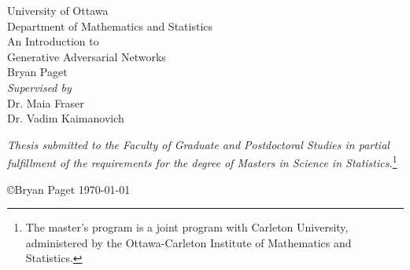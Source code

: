 \begin{titlepage}
  \scshape
  \begin{center}
    \LARGE
    University of Ottawa \\
    \small
    Department of Mathematics and Statistics \\
    \vspace{1cm}
    \Large
    An Introduction to \\
    \vspace{-0.2cm}
    \huge
    Generative Adversarial Networks \\
    \vspace{4.5cm}
    \Huge
    Bryan Paget \\
    \textit{
      \large
      Supervised by} \\
    \vspace{0.3cm}
    \Large Dr. Maia Fraser \\
    Dr. Vadim Kaimanovich \\

    \vspace{3cm}

    \small \textit{Thesis submitted to the Faculty of Graduate and
      Postdoctoral Studies in partial \\ fulfillment of the
      requirements for the degree of Masters in Science in
      Statistics.}\footnote{The master's program is a joint program
      with Carleton University, administered by the Ottawa-Carleton
      Institute of Mathematics and Statistics.}

    \vspace*{\fill}

    \small \copyright Bryan Paget \today

  \end{center}
\end{titlepage}

\afterpage{\null\blankpage}

